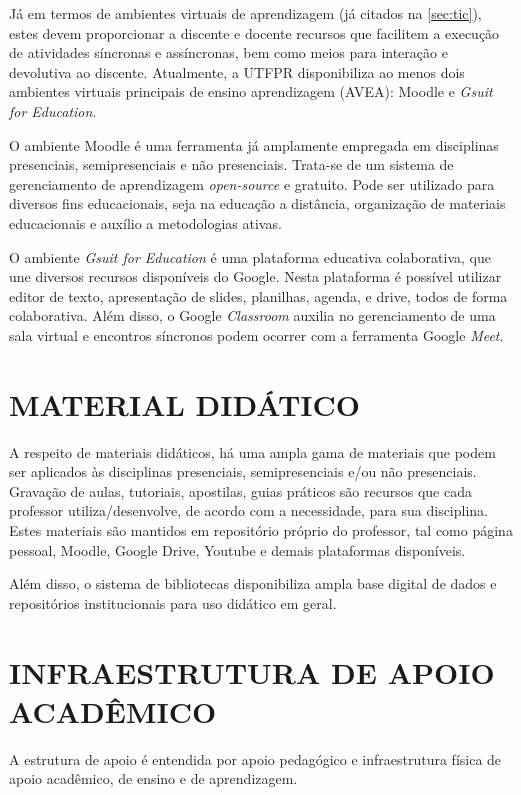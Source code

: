 Já em termos de ambientes virtuais de aprendizagem (já citados na \autoref{sec:tic}), estes devem proporcionar a discente e docente recursos que facilitem a execução de atividades síncronas e assíncronas, bem como meios para interação e devolutiva ao discente. Atualmente, a UTFPR disponibiliza ao menos dois ambientes virtuais principais de ensino aprendizagem (AVEA): Moodle e \textit{Gsuit for Education}.

O ambiente Moodle é uma ferramenta já amplamente empregada em disciplinas presenciais, semipresenciais e não presenciais. Trata-se de um sistema de gerenciamento de aprendizagem \textit{open-source} e gratuito. Pode ser utilizado para diversos fins educacionais, seja na educação a distância, organização de materiais educacionais e auxílio a metodologias ativas.

O ambiente \textit{Gsuit for Education} é uma plataforma educativa colaborativa, que une diversos recursos disponíveis do Google. Nesta plataforma é possível utilizar editor de texto, apresentação de slides, planilhas, agenda, e drive, todos de forma colaborativa. Além disso, o Google \textit{Classroom} auxilia no gerenciamento de uma sala virtual e encontros síncronos podem ocorrer com a ferramenta Google \textit{Meet}.

\section{MATERIAL DIDÁTICO}

A respeito de materiais didáticos, há uma ampla gama de materiais que podem ser aplicados às disciplinas presenciais, semipresenciais e/ou não presenciais. Gravação de aulas, tutoriais, apostilas, guias práticos são recursos que cada professor utiliza/desenvolve, de acordo com a necessidade, para sua disciplina. Estes materiais são mantidos em repositório próprio do professor, tal como página pessoal, Moodle, Google Drive, Youtube e demais plataformas disponíveis.

Além disso, o sistema de bibliotecas disponibiliza ampla base digital de dados e repositórios institucionais para uso didático em geral.

\section{INFRAESTRUTURA DE APOIO ACADÊMICO}

A estrutura de apoio é entendida por apoio pedagógico e infraestrutura física de apoio acadêmico, de ensino e de aprendizagem.

